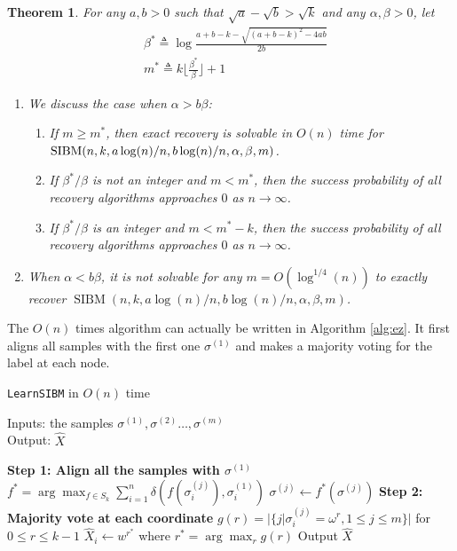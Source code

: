 \documentclass[conference]{IEEEtran}
\newtheorem{theorem}{Theorem}%
\DeclareMathOperator{\SIBM}{SIBM}
\begin{document}
	\begin{theorem} \label{thm:wt1}
		For any $a,b> 0$ such that $\sqrt{a}-\sqrt{b}> \sqrt{k}$ and any $\alpha,\beta>0$, let
		\begin{align} \label{eq:defstar}
		&\beta^\ast \triangleq
		\log\frac{a+b-k-\sqrt{(a+b-k)^2-4ab}}{2 b}  \\
		&m^\ast \triangleq k \Big\lfloor \frac{\beta^\ast}{\beta} \Big\rfloor +1 
		\end{align}
		\begin{enumerate}
			\item We discuss the case when $\alpha > b \beta$:
			\begin{enumerate}
				\item If $m\ge m^\ast$, then exact recovery is solvable in $O(n)$ time for $\SIBM(n,k, a\log(n)/n, \linebreak[4] b\log(n)/n,\alpha,\beta,m)$.
				\item If $\beta^\ast/\beta$ is not an integer and $m < m^\ast$, then the success probability of all recovery algorithms approaches $0$ as $n\to\infty$.
				\item If $\beta^\ast/\beta$ is an integer and $m < m^\ast - k$, then the success probability of all recovery algorithms approaches $0$ as $n\to\infty$.
			\end{enumerate}
			\item When $\alpha < b \beta$, it is not solvable for any $m=O(\log^{1/4}(n))$ to exactly recover $\SIBM(n,k, a\log(n)/n, b\log(n)/n,\alpha,\beta,m)$.
		\end{enumerate}
		
	\end{theorem}
	The $O(n)$ times algorithm can actually be written in Algorithm \ref{alg:ez}. It first aligns all samples with the first one $\sigma^{(1)}$ and
	makes a majority voting for the label at each node.
	\begin{algorithm}
		\caption{\texttt{LearnSIBM} in $O(n)$ time} \label{alg:ez}
		Inputs: the samples $\sigma^{(1)},\sigma^{(2)}\dots,\sigma^{(m)}$ \\
		Output: $\hat{X}$
		\begin{algorithmic}[1]
			\Statex 
			{\bf Step 1: Align all the samples with $\sigma^{(1)}$ }
			\State $f^* = \arg\max_{f \in S_k} \sum_{i=1}^n \delta(f(\sigma^{(j)}_i), \sigma^{(1)}_i)$
			\State $\sigma^{(j)} \gets f^*(\sigma^{(j)})$
			\EndFor
			\Statex
			{\bf Step 2: Majority vote at each coordinate}
			\State $g(r) = |\{j | \sigma^{(j)}_i = \omega^r,1\leq j \leq m\}|$  for $ 0 \leq r \leq k-1$
			\State $\hat{X}_i \gets w^{r^*}$ where $r^*=\arg\max_r g(r)$
			\State{}
			\EndFor
			\State Output $\hat{X}$
		\end{algorithmic}
	\end{algorithm}
	
\end{document}

